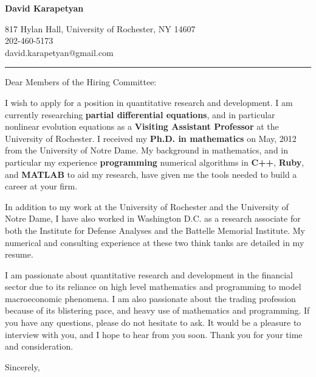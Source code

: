 \documentclass[12pt]{letter}
\date{\vspace{0.5cm}\flushleft}
\begin{document}
\begin{letter}{}
\begin{center}
{\bf {\Large David Karapetyan}}
\end{center}

\begin{center}
{817 Hylan Hall, University of Rochester, NY 14607  \\ 
202-460-5173 \\  david.karapetyan@gmail.com
}
\end{center}
\hrule

\opening{Dear Members of the Hiring Committee:\\}
%
%
I wish to apply for a position in quantitative research and development. I am currently researching \textbf{partial differential equations}, and in particular nonlinear evolution equations as a \textbf{Visiting Assistant Professor} at the University of Rochester. I received my \textbf{Ph.D. in mathematics} on May, 2012 from the University of Notre Dame. My
background in mathematics, and in particular my experience
\textbf{programming} numerical algorithms in \textbf{C++}, \textbf{Ruby}, and \textbf{MATLAB}
to aid my research, have given me the tools needed to build a career at your firm.

In addition to my work at the University of Rochester and the University of Notre Dame, I have also worked in Washington D.C. as a research
associate for both the Institute for Defense Analyses and the Battelle Memorial
Institute. My numerical and consulting experience at these two think tanks are
detailed in my resume. 

I am passionate about quantitative research and development in the financial sector due to its reliance on high level mathematics and programming to model macroeconomic phenomena. I am also passionate about the trading profession because of its blistering pace, and heavy use of mathematics and programming. 
If you have any questions, please do not hesitate to ask. It would be a
pleasure to interview with you, and I hope to hear from you soon. Thank you for
your time and consideration. 

\closing{Sincerely,}


\end{letter}
\end{document}
